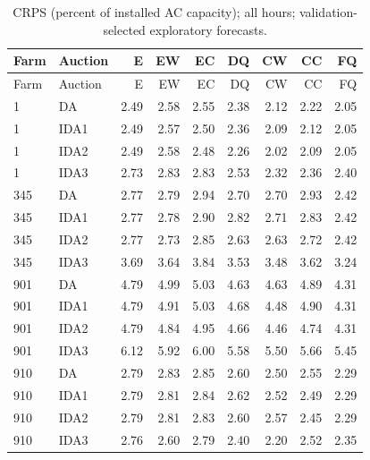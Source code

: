 \documentclass[11pt,a4paper]{article}
\begin{document}
\begin{longtable}{llrrrrrrr}
\caption{CRPS (percent of installed AC capacity); all hours; validation-selected exploratory forecasts.}\\
\toprule Farm & Auction & E & EW & EC & DQ & CW & CC & FQ \\
\midrule\endfirsthead
\toprule Farm & Auction & E & EW & EC & DQ & CW & CC & FQ \\
\midrule\endhead
1 & DA & 2.49 & 2.58 & 2.55 & 2.38 & 2.12 & 2.22 & 2.05 \\
1 & IDA1 & 2.49 & 2.57 & 2.50 & 2.36 & 2.09 & 2.12 & 2.05 \\
1 & IDA2 & 2.49 & 2.58 & 2.48 & 2.26 & 2.02 & 2.09 & 2.05 \\
1 & IDA3 & 2.73 & 2.83 & 2.83 & 2.53 & 2.32 & 2.36 & 2.40 \\
\midrule
345 & DA & 2.77 & 2.79 & 2.94 & 2.70 & 2.70 & 2.93 & 2.42 \\
345 & IDA1 & 2.77 & 2.78 & 2.90 & 2.82 & 2.71 & 2.83 & 2.42 \\
345 & IDA2 & 2.77 & 2.73 & 2.85 & 2.63 & 2.63 & 2.72 & 2.42 \\
345 & IDA3 & 3.69 & 3.64 & 3.84 & 3.53 & 3.48 & 3.62 & 3.24 \\
\midrule
901 & DA & 4.79 & 4.99 & 5.03 & 4.63 & 4.63 & 4.89 & 4.31 \\
901 & IDA1 & 4.79 & 4.91 & 5.03 & 4.68 & 4.48 & 4.90 & 4.31 \\
901 & IDA2 & 4.79 & 4.84 & 4.95 & 4.66 & 4.46 & 4.74 & 4.31 \\
901 & IDA3 & 6.12 & 5.92 & 6.00 & 5.58 & 5.50 & 5.66 & 5.45 \\
\midrule
910 & DA & 2.79 & 2.83 & 2.85 & 2.60 & 2.50 & 2.55 & 2.29 \\
910 & IDA1 & 2.79 & 2.81 & 2.84 & 2.62 & 2.52 & 2.49 & 2.29 \\
910 & IDA2 & 2.79 & 2.81 & 2.83 & 2.60 & 2.57 & 2.45 & 2.29 \\
910 & IDA3 & 2.76 & 2.60 & 2.79 & 2.40 & 2.20 & 2.52 & 2.35 \\
\midrule
\bottomrule\end{longtable}
\normalsize
\small
\end{document}
